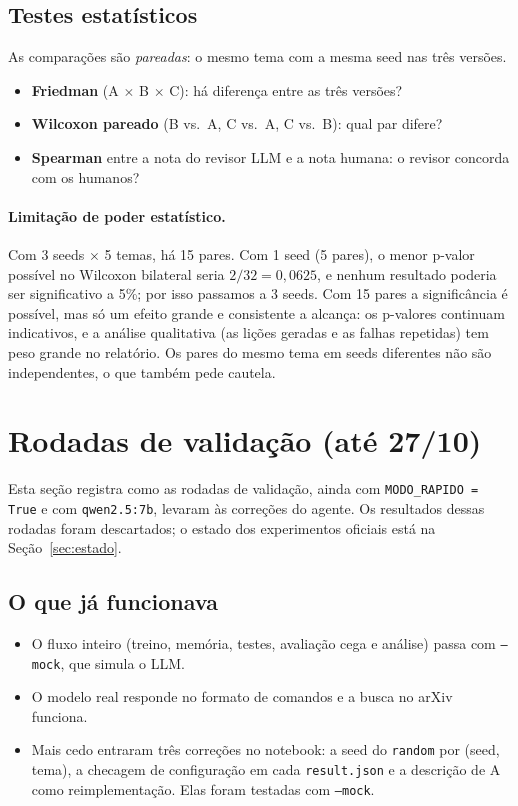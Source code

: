 \documentclass[11pt,a4paper]{article}
\begin{document}
\subsection{Testes estatísticos}

As comparações são \emph{pareadas}: o mesmo tema com a mesma seed nas três versões.

\begin{itemize}
  \item \textbf{Friedman} (A $\times$ B $\times$ C): há diferença entre as três versões?
  \item \textbf{Wilcoxon pareado} (B vs.\ A, C vs.\ A, C vs.\ B): qual par difere?
  \item \textbf{Spearman} entre a nota do revisor LLM e a nota humana: o revisor concorda com os humanos?
\end{itemize}

\paragraph{Limitação de poder estatístico.} Com 3 seeds $\times$ 5 temas, há 15 pares. Com
1 seed (5 pares), o menor p-valor possível no Wilcoxon bilateral seria $2/32 = 0{,}0625$, e nenhum
resultado poderia ser significativo a 5\%; por isso passamos a 3 seeds. Com 15 pares a
significância é possível, mas só um efeito grande e consistente a alcança: os p-valores continuam
indicativos, e a análise qualitativa (as lições geradas e as falhas repetidas) tem peso grande no
relatório. Os pares do mesmo tema em seeds diferentes não são independentes, o que também pede
cautela.

\section{Rodadas de validação (até 27/10)}

Esta seção registra como as rodadas de validação, ainda com \texttt{MODO\_RAPIDO = True} e com
\texttt{qwen2.5:7b}, levaram às correções do agente. Os resultados dessas rodadas foram
descartados; o estado dos experimentos oficiais está na Seção~\ref{sec:estado}.

\subsection{O que já funcionava}

\begin{itemize}
  \item O fluxo inteiro (treino, memória, testes, avaliação cega e análise) passa com
        \texttt{--mock}, que simula o LLM.
  \item O modelo real responde no formato de comandos e a busca no arXiv funciona.
  \item Mais cedo entraram três correções no notebook: a seed do \texttt{random} por (seed, tema), a
        checagem de configuração em cada \texttt{result.json} e a descrição de A como
        reimplementação. Elas foram testadas com \texttt{--mock}.
\end{itemize}
\end{document}
